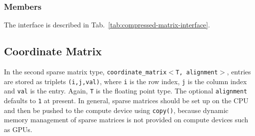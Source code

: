 \subsubsection{Members}
The interface is described in Tab.~\ref{tab:compressed-matrix-interface}.

\subsection{Coordinate Matrix}
In the second sparse matrix type, \texttt{coordinate\_matrix$<$T, alignment$>$},
entries are stored as triplets \texttt{(i,j,val)}, where \texttt{i} is the row index, \texttt{j} is the column index and \texttt{val} is the entry.
Again, \texttt{T} is the floating point type. The optional \texttt{alignment} defaults to \texttt{1} at present.
In general, sparse matrices should be set up on the
CPU and then be pushed to the compute device using \texttt{copy()}, because dynamic memory management of sparse matrices is not provided on {\OpenCL} compute devices such as GPUs.


